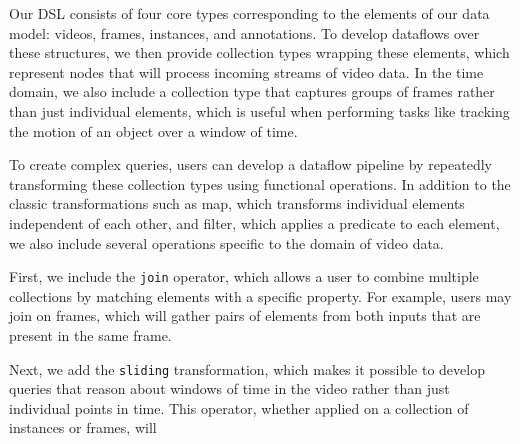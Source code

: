 Our DSL consists of four core types corresponding to the elements of our data model: videos, frames, instances, and annotations. To develop dataflows over these structures, we then provide collection types wrapping these elements, which represent nodes that will process incoming streams of video data. In the time domain, we also include a collection type that captures groups of frames rather than just individual elements, which is useful when performing tasks like tracking the motion of an object over a window of time.

To create complex queries, users can develop a dataflow pipeline by repeatedly transforming these collection types using functional operations. In addition to the classic transformations such as map, which transforms individual elements independent of each other, and filter, which applies a predicate to each element, we also include several operations specific to the domain of video data.

First, we include the \texttt{join} operator, which allows a user to combine multiple collections by matching elements with a specific property. For example, users may join on frames, which will gather pairs of elements from both inputs that are present in the same frame.

Next, we add the \texttt{sliding} transformation, which makes it possible to develop queries that reason about windows of time in the video rather than just individual points in time. This operator, whether applied on a collection of instances or frames, will 




